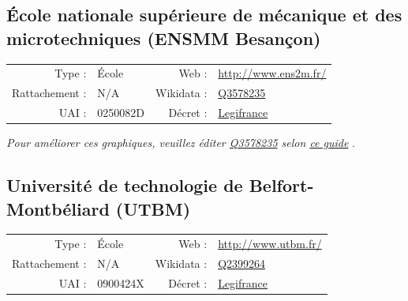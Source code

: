 \documentclass[11pt,french,landscape]{article}
\begin{document}
\hypertarget{uxe9cole-nationale-supuxe9rieure-de-muxe9canique-et-des-microtechniques-ensmm-besanuxe7on}{%
\subsection{École nationale supérieure de mécanique et des
microtechniques (ENSMM
Besançon)}\label{uxe9cole-nationale-supuxe9rieure-de-muxe9canique-et-des-microtechniques-ensmm-besanuxe7on}}

\begin{tabular*}{0.45\textwidth}{rp{2cm}rl}  
\hline  
Type : & École & Web : &\href{http://www.ens2m.fr/}{http://www.ens2m.fr/} \\  
Rattachement : & N/A & Wikidata : & \href{https://www.wikidata.org/entity/Q3578235}{Q3578235} \\  
UAI : & 0250082D & Décret : & \href{http://www.legifrance.gouv.fr/affichTexte.do;jsessionid=9F6183426F68F6E802BCEC824495876F.tpdila09v_3?cidTexte=JORFTEXT000031402219&dateTexte=&oldAction=rechJO&categorieLien=id&idJO=JORFCONT000031402159}{Legifrance} \\  
\hline  
\end{tabular*}

\textit{\scriptsize Pour améliorer ces graphiques, veuillez éditer \href{https://www.wikidata.org/entity/Q3578235}{Q3578235}  selon \href{https://github.com/cpesr/wikidataESR/blob/master/Rmd/wikidataESR.md}{ce guide}}
.


\newpage

\hypertarget{universituxe9-de-technologie-de-belfort-montbuxe9liard-utbm}{%
\subsection{Université de technologie de Belfort-Montbéliard
(UTBM)}\label{universituxe9-de-technologie-de-belfort-montbuxe9liard-utbm}}

\begin{tabular*}{0.45\textwidth}{rp{2cm}rl}  
\hline  
Type : & École & Web : &\href{http://www.utbm.fr/}{http://www.utbm.fr/} \\  
Rattachement : & N/A & Wikidata : & \href{https://www.wikidata.org/entity/Q2399264}{Q2399264} \\  
UAI : & 0900424X & Décret : & \href{http://www.legifrance.gouv.fr/affichTexte.do?dateTexte=&categorieLien=id&cidTexte=JORFTEXT000000209137&fastPos=3&fastReqId=32302630&oldAction=rechExpTexteJorf}{Legifrance} \\  
\hline  
\end{tabular*}
\end{document}
